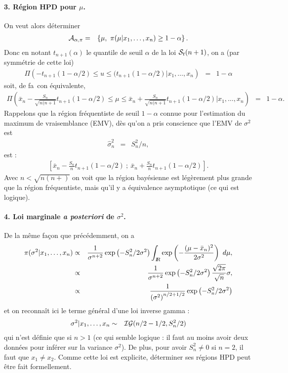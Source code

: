 \begin{rep}
\paragraph{3. Région HPD pour $\mu$.}
On veut alors déterminer 
\begin{eqnarray*}
{\cal{A}}_{\alpha,\pi} & = & \left\{\mu, \ \pi(\mu|x_1,\ldots,x_n ) \geq 1-\alpha\right\}.
\end{eqnarray*}
Donc en notant $t_{n+1}(\alpha)$ le quantile de seuil $\alpha$ de la loi ${\cal{S}}_t(n+1)$, on a (par symmétrie de cette loi)
\begin{eqnarray*}
\Pi\left(-t_{n+1}(1-\alpha/2) \leq u \leq (t_{n+1}(1-\alpha/2)|x_1,\ldots,x_n\right) & = & 1-\alpha
\end{eqnarray*}
soit, de fa\ con équivalente,
\begin{eqnarray*}
\Pi\left(\bar{x}_n-\frac{S_n}{\sqrt{n(n+1}}t_{n+1}(1-\alpha/2) \leq \mu \leq \bar{x}_n+\frac{S_n}{\sqrt{n(n+1}}t_{n+1}(1-\alpha/2)|x_1,\ldots,x_n\right) & = & 1-\alpha.
\end{eqnarray*}
Rappelons que la région fréquentiste de seuil $1-\alpha$ connue pour l'estimation du maximum de vraisemblance (EMV), dès qu'on a pris conscience que l'EMV de $\sigma^2$ est
\begin{eqnarray*}
\hat{\sigma}^2_n & = & S^2_n/n,
\end{eqnarray*}
est :
\begin{eqnarray*}
\left[\bar{x}_n-\frac{S_n}{n}t_{n+1}(1-\alpha/2) \ ; \ \bar{x}_n+\frac{S_n}{n}t_{n+1}(1-\alpha/2)\right].
\end{eqnarray*}
Avec $n<\sqrt{n(n+)}$ on voit que la région bayésienne est légèrement plus grande que la région fréquentiste, mais qu'il y a équivalence asymptotique (ce qui est logique). 


\paragraph{4. Loi marginale {\it a posteriori} de $\sigma^2$.} De la même fa\c con que précédemment, on a 
\begin{eqnarray*}
\pi(\sigma^2|x_1,\ldots,x_n) & \propto & \frac{1}{\sigma^{n+2}}   \exp\left(-S^2_n/2\sigma^2\right) \int_{I\!\!R} \exp\left(-\frac{(\mu-\bar{x}_n)^2}{2\sigma^2}\right) \ d\mu, \\
 & \propto & \frac{1}{\sigma^{n+2}}   \exp\left(-S^2_n/2\sigma^2\right) \frac{\sqrt{2\pi}}{\sqrt{n}}\sigma, \\
 & \propto &  \frac{1}{\left(\sigma^2\right)^{n/2+1/2}} \exp\left(-S^2_n/2\sigma^2\right)
\end{eqnarray*}
et on reconnaît ici le terme général d'une loi inverse gamma :
\begin{eqnarray*}
\sigma^2|x_1,\ldots,x_n  & \sim & {\cal{IG}}(n/2-1/2,S^2_n/2)
\end{eqnarray*}
qui n'est définie que si $n>1$ (ce qui semble logique : il faut au moins avoir deux données pour inférer sur la variance $\sigma^2$). De plus, pour avoir $S^2_n\neq 0$ si $n=2$, il faut que $x_1\neq x_2$. Comme cette loi est explicite, déterminer ses régions HPD peut être fait formellement. 



\end{rep}
